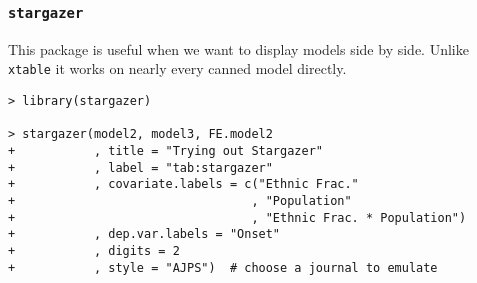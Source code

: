 \subsubsection*{\texttt{stargazer}}

This package is useful when we want to display models side by side. Unlike \texttt{xtable} it works on nearly every canned model directly.

\begin{lstlisting}
> library(stargazer)

> stargazer(model2, model3, FE.model2
+           , title = "Trying out Stargazer"
+           , label = "tab:stargazer"
+           , covariate.labels = c("Ethnic Frac."
+                                 , "Population"
+                                 , "Ethnic Frac. * Population")
+           , dep.var.labels = "Onset"
+           , digits = 2
+           , style = "AJPS")  # choose a journal to emulate


\end{lstlisting}
